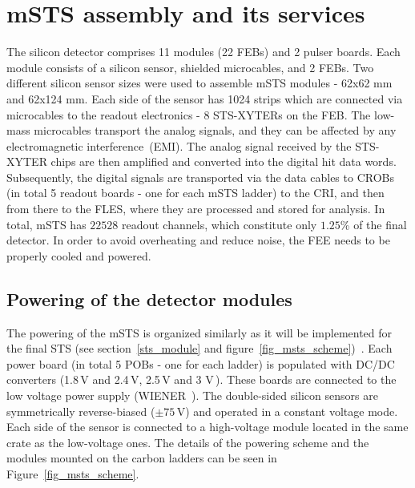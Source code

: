 \section{mSTS assembly and its services}

 The silicon detector comprises 11 modules (22 \glspl{FEB}) and 2 pulser boards. Each module consists of a silicon sensor, shielded microcables, and 2 \glspl{FEB}. Two different silicon sensor sizes were used to assemble \gls{mSTS} modules - 62x62 mm and 62x124 mm. Each side of the sensor has 1024 strips which are connected via microcables to the readout electronics - 8 STS-XYTERs on the \gls{FEB}. The low-mass microcables transport the analog signals, and they can be affected by any electromagnetic interference~(\gls{EMI}). The analog signal received by the STS-XYTER chips are then amplified and converted into the digital hit data words. Subsequently, the digital signals are transported via the data cables to \glspl{CROB} (in total 5 readout boards - one for each \gls{mSTS} ladder) to the \gls{CRI}, and then from there to the \gls{FLES}, where they are processed and stored for analysis. In total, \gls{mSTS} has $22 528$ readout channels, which constitute only $1.25$\% of the final detector. In order to avoid overheating and reduce noise, the \gls{FEE} needs to be properly cooled and powered.  
\subsection{Powering of the detector modules}
\label{module}
The powering of the \gls{mSTS} is organized similarly as it will be implemented for the final \gls{STS} (see section~\ref{sts_module} and figure~\ref{fig_msts_scheme})~\cite{Koczon:2020Jc}. Each power board (in total 5 \glspl{POB} - one for each ladder) is populated with DC/DC converters (1.8\,V and 2.4\,V, 2.5\,V and 3 V\,\cite{DC_DC_converter}). These boards are connected to the low voltage power supply (WIENER~\cite{wiener}). The double-sided silicon sensors are symmetrically reverse-biased ($\pm 75$\,V) and operated in a constant voltage mode. Each side of the sensor is connected to a high-voltage module located in the same crate as the low-voltage ones. The details of the powering scheme and the modules mounted on the carbon ladders can be seen in Figure~\ref{fig_msts_scheme}.

